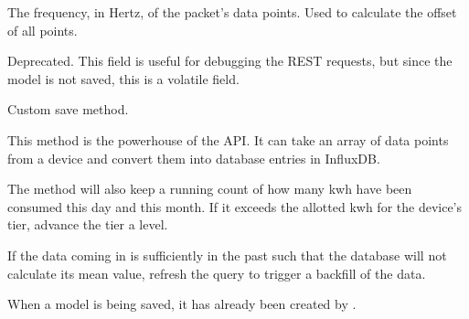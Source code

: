 \documentclass[letterpaper,10pt,english]{sphinxmanual}
\begin{document}
\begin{fulllineitems}
\begin{fulllineitems}
\end{fulllineitems}


\begin{fulllineitems}
\label{modules/microdata:microdata.models.Event.frequency}
The frequency, in Hertz, of the packet's data points. Used to calculate the offset of all points.

\end{fulllineitems}


\begin{fulllineitems}
\label{modules/microdata:microdata.models.Event.objects}
\end{fulllineitems}


\begin{fulllineitems}
\label{modules/microdata:microdata.models.Event.query}
Deprecated. This field is useful for debugging the REST requests, but since the model is not saved, this is a volatile field.

\end{fulllineitems}


\begin{fulllineitems}
\label{modules/microdata:microdata.models.Event.save}
Custom save method.

This method is the powerhouse of the API. It can take an array of data points from a device and convert them into database entries in InfluxDB.

The method will also keep a running count of how many kwh have been consumed this day and this month. If it exceeds the allotted kwh for
the device's tier, advance the tier a level.

If the data coming in is sufficiently in the past such that the database will not calculate its mean value, refresh the query
to trigger a backfill of the data.

When a model is being saved, it has already been created by {\hyperref[modules/microdata:microdata.views.EventViewSet]{\emph{}}}.


\end{fulllineitems}
\end{fulllineitems}
\end{document}
